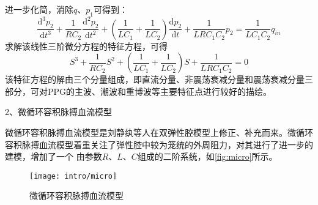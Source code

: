 进一步化简，消除$q$、$p_{1}$可得到：
\begin{equation}
    \label{equ:diff}
    \frac{\mathrm{d^3} p_{2}}{\mathrm{d} t^3}+\frac{1}{RC_{2}}\frac{\mathrm{d}^2p_{2} }{\mathrm{d} t^2}+
    (\frac{1}{LC_{1}}+\frac{1}{LC_{2}})\frac{\mathrm{d} p_{2}}{\mathrm{d} t}+\frac{1}{LRC_{1}C_{2}}p_{2}
    =\frac{1}{LC_{1}C_{2}}q_{in}
\end{equation}
求解该线性三阶微分方程的特征方程，可得
\begin{equation}
    \label{equ:character}
    S^3+\frac{1}{RC_{2}}S^2+(\frac{1}{LC_{1}}+\frac{1}{LC_{2}})S+\frac{1}{LRC_{1}C_{2}}=0
\end{equation}
该特征方程的解由三个分量组成，即直流分量、非震荡衰减分量和震荡衰减分量三部分，可对PPG的主波、潮波和重博波等主要特征点进行较好的描绘。

2、微循环容积脉搏血流模型

微循环容积脉搏血流模型是刘静纨等人\cite{Liu2001}在双弹性腔模型上修正、补充而来。微循环容积脉搏血流模型着重关注了弹性腔中较为笼统的外周阻力，对其进行了进一步的建模，增加了一个
由参数$R$、$L$、$C$组成的二阶系统，如\autoref{fig:micro}所示。
\begin{figure}[htbp]
    \centering
    \texttt{[image: intro/micro]}
    \caption[微循环容积脉搏血流模型]{\label{fig:micro}微循环容积脉搏血流模型\cite{PPGYY}}
\end{figure}

